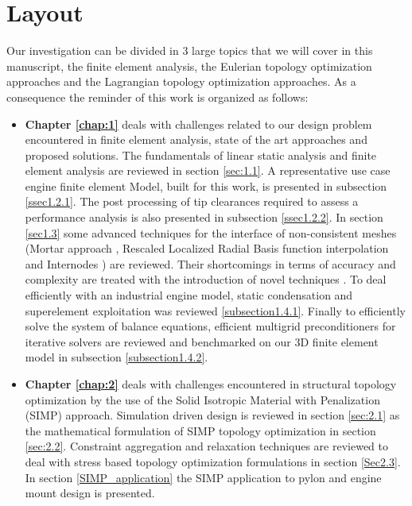 \section*{Layout}
Our investigation can be divided in 3 large topics that we will cover in this manuscript, the finite element analysis, the Eulerian topology optimization approaches and the Lagrangian topology optimization approaches.
As a consequence the reminder of this work is organized as follows:
\begin{itemize}
\item \textbf{Chapter \ref{chap:1}} deals with challenges related to our design problem encountered in finite element analysis, state of the art approaches and proposed solutions.  The fundamentals of linear static analysis and finite element analysis are reviewed in section \ref{sec:1.1}. A representative use case engine finite element Model,  built for this work, is presented in subsection \ref{ssec1.2.1}. The post processing of tip clearances required to assess a performance analysis is also presented in subsection \ref{ssec1.2.2}.  In section \ref{sec1.3} some advanced techniques for the interface of non-consistent meshes (Mortar approach \cite{bernardi1989new}, Rescaled Localized Radial Basis function interpolation \cite{deparis2014rescaled} and Internodes \cite{deparis2016internodes}) are reviewed. Their shortcomings in terms of accuracy and complexity are treated with the introduction of novel techniques \cite{coniglio2018weighted}. To deal efficiently with an industrial engine model, static condensation and superelement exploitation was reviewed \ref{subsection1.4.1}. Finally to efficiently solve the system of balance equations, efficient multigrid preconditioners for iterative solvers are reviewed and benchmarked on our 3D finite element model in subsection \ref{subsection1.4.2}. 
\item \textbf{Chapter \ref{chap:2}} deals with challenges encountered in structural topology optimization by the use of the Solid Isotropic Material with Penalization (SIMP) approach. Simulation driven design is reviewed in section \ref{sec:2.1} as the mathematical formulation of SIMP topology optimization in section \ref{sec:2.2}. Constraint aggregation and relaxation techniques are reviewed to deal with stress based topology optimization formulations in section \ref{Sec2.3}.
In section \ref{SIMP_application} the SIMP application to pylon and engine mount design is presented.

\end{itemize}
